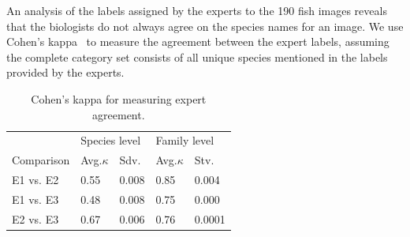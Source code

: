 An analysis of the labels assigned by the experts to the 190 fish
images reveals that the biologists do not always agree on the species
names for an image.
We use Cohen's kappa~\cite{Cohen60} to measure the agreement between
the expert labels, assuming the complete category set consists of all
unique species mentioned in the labels provided by the experts. 
\begin{table}[h!]
\centering
 \begin{tabular}{@{~}l@{~~~}l@{~~~}l@{~~~~~}l@{~~~}l@{~}}
 \hline
  & \multicolumn{2}{l}{Species level} & \multicolumn{2}{l}{Family level}\\
  Comparison & Avg.$\kappa$ & Sdv. & Avg.$\kappa$ & Stv.\\
  \hline
  E1 vs. E2  & 0.55 & 0.008 & 0.85 & 0.004\\
  E1 vs. E3  & 0.48 & 0.008 & 0.75 & 0.000\\
  E2 vs. E3  & 0.67 & 0.006 & 0.76 & 0.0001\\
  \hline
 \end{tabular}
  \caption{Cohen's kappa for measuring expert agreement.}
\label{tab:expert_agree}
\end{table}
%

